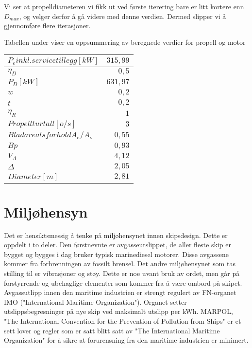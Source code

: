 \documentclass[norsk]{article}
\begin{document}
Vi ser at propelldiameteren vi fikk ut ved første iterering bare er litt kortere enn $D_{max}$, og velger derfor å gå videre med denne verdien. Dermed slipper vi å gjennomføre flere iterasjoner. 

Tabellen under viser en oppsummering av beregnede verdier for propell og motor

\begin{table}[htp]
\centering
\begin{tabular}{|l|r|}
\toprule
$P_e inkl. servicetillegg[kW]$ & $315,99$\\
\midrule
$\eta_D$ & $0,5$\\
\midrule
$P_D [kW]$ & $631,97$\\
\midrule
$w$ & $0,2$\\
\midrule
$t$ & $0,2$ \\
\midrule
$\eta_R$ & $1$  \\
\midrule
$Propellturtall[o/s]$ & $3$\\
\midrule
$Bladarealsforhold A_e/A_o$ & $0,55$\\
\midrule
$Bp$ & $0,93$\\
\midrule
$V_A$ & $4,12$\\
\midrule
$\Delta$ & $2,05$\\
\midrule
$Diameter[m]$ & $2,81$\\
\bottomrule
\end{tabular}
\end{table}

\section{Miljøhensyn}
Det er hensiktsmessig å tenke på miljøhensynet innen skipsdesign. Dette er oppdelt i to deler. Den førstnevnte er avgasseutslippet, de aller fleste skip er bygget og bygges i dag bruker typisk marinediesel motorer. Disse avgassene kommer fra forbrenningen av fossilt brensel. Det andre miljøhensynet som tas stilling til er vibrasjoner og støy. Dette er noe uvant bruk av ordet, men går på forstyrrende og ubehaglige elementer som kommer fra å være ombord på skipet. Avgassutlipp innen den maritime industrien er strengt regulert av FN-organet IMO ("International Maritime Organization"). Organet setter utslippsbegresninger på nye skip ved maksimalt utslipp per kWh. MARPOL, "The International Convention for the Prevention of Pollution from Ships" er et sett lover og regler som er satt blitt satt av "The International Maritime Organization" for å sikre at forurensning fra den maritime industrien er minimert. 
\end{document}
